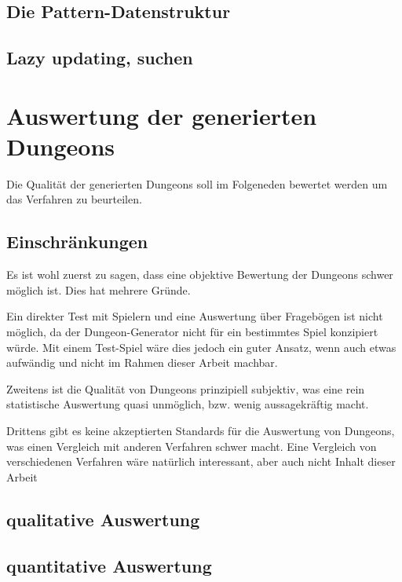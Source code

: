 \section{Die Pattern-Datenstruktur}

\section{Lazy updating, suchen}

\chapter{Auswertung der generierten Dungeons}

Die Qualität der generierten Dungeons soll im Folgeneden bewertet werden um das Verfahren zu beurteilen. 

\section{Einschränkungen}

Es ist wohl zuerst zu sagen, dass eine objektive Bewertung der Dungeons schwer möglich ist. Dies hat mehrere Gründe.

Ein direkter Test mit Spielern und eine Auswertung über Fragebögen ist nicht möglich, da der Dungeon-Generator nicht für ein bestimmtes Spiel konzipiert würde. Mit einem Test-Spiel wäre dies jedoch ein guter Ansatz, wenn auch etwas aufwändig und nicht im Rahmen dieser Arbeit machbar.

Zweitens ist die Qualität von Dungeons prinzipiell subjektiv, was eine rein statistische Auswertung quasi unmöglich, bzw. wenig aussagekräftig macht.

Drittens gibt es keine akzeptierten Standards für die Auswertung von Dungeons, was einen Vergleich mit anderen Verfahren schwer macht. Eine Vergleich von verschiedenen Verfahren wäre natürlich interessant, aber auch nicht Inhalt dieser Arbeit 

\section{qualitative Auswertung}

\section{quantitative Auswertung}


